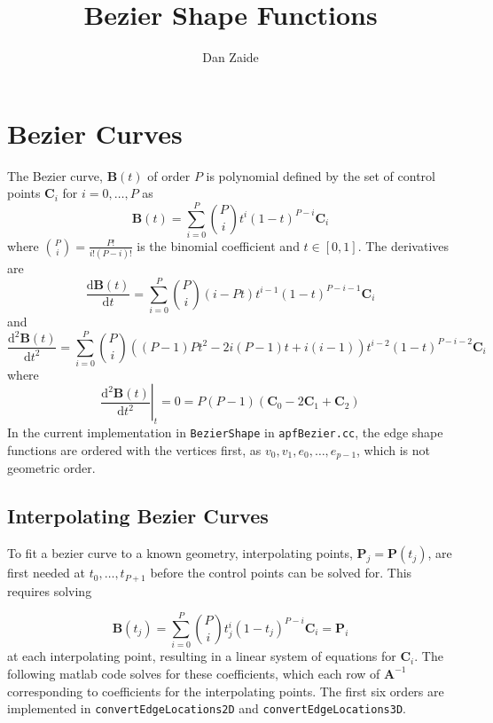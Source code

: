 \documentclass{article}
\title{Bezier Shape Functions}
\author{Dan Zaide}
\begin{document}
\maketitle

\section{Bezier Curves}
The Bezier curve, $\mathbf{B}(t)$ of order $P$ is polynomial defined by the set of control points $\mathbf{C}_i$ for $i = 0,\ldots,P$ as 
\[
\mathbf{B}(t) = \displaystyle \sum_{i=0}^P {P \choose i}t^i(1-t)^{P-i}\mathbf{C}_i
\]
where ${P \choose i}= \frac{P!}{i!(P-i)!}$ is the binomial coefficient and $ t \in [0,1]$. The derivatives are
\[
\frac{\mathrm{d} \mathbf{B}(t)}{\mathrm{d} t} = \displaystyle \sum_{i=0}^P {P \choose i}(i-Pt)t^{i-1}(1-t)^{P-i-1}\mathbf{C}_i
\]
and
\[
\frac{\mathrm{d}^2 \mathbf{B}(t)}{\mathrm{d} t^2} = \displaystyle \sum_{i=0}^P {P \choose i}((P-1)Pt^2-2i(P-1)t+i(i-1))t^{i-2}(1-t)^{P-i-2}\mathbf{C}_i
\]
where
\[\left.\frac{\mathrm{d}^2 \mathbf{B}(t)}{\mathrm{d} t^2}\right|_t=0 = P(P-1)(\mathbf{C}_0-2\mathbf{C}_1+\mathbf{C}_2)\]
In the current implementation in \texttt{BezierShape} in \texttt{apfBezier.cc}, the edge shape functions are ordered with the vertices first, as $v_0,v_1,e_0,\ldots,e_{p-1}$, which is not geometric order.
\subsection{Interpolating Bezier Curves}
To fit a bezier curve to a known geometry, interpolating points, $\mathbf{P}_j = \mathbf{P}(t_j)$, are first needed at $t_0,\ldots, t_{P+1}$ before the control points can be solved for. This requires solving

\[
\mathbf{B}(t_j) = \displaystyle \sum_{i=0}^P {P \choose i}t_j^i(1-t_j)^{P-i}\mathbf{C}_i = \mathbf{P}_i
\]
at each interpolating point, resulting in a linear system of equations for $\mathbf{C}_i$. The following matlab code solves for these coefficients, which each row of $\mathbf{A}^{-1}$ corresponding to coefficients for the interpolating points. The first six orders are implemented in \texttt{convertEdgeLocations2D} and \texttt{convertEdgeLocations3D}.

\end{document}

